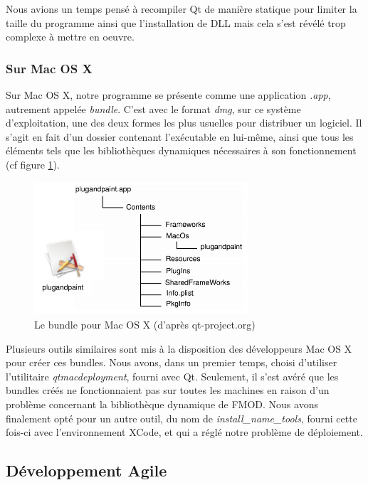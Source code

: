 Nous avions un temps pensé à recompiler Qt de manière statique pour limiter la taille du programme ainsi que l'installation de DLL mais cela s'est révélé trop complexe à mettre en oeuvre.

\subsubsection{Sur Mac OS X}

Sur Mac OS X, notre programme se présente comme une application \textit{.app}, autrement appelée \textit{bundle}. C'est avec le format \textit{dmg}, sur ce système d'exploitation, une des deux formes les plus usuelles pour distribuer un logiciel. Il s'agit en fait d'un dossier contenant l'exécutable en lui-même, ainsi que tous les éléments tels que les bibliothèques dynamiques nécessaires à son fonctionnement (cf figure \ref{app_mac_os}).

\begin{figure}[H]
\begin{center}
\includegraphics[width=300px]{bundle_mac.png}
\caption{Le bundle pour Mac OS X (d'après qt-project.org)}
\label{app_mac_os}
\end{center}
\end{figure}

Plusieurs outils similaires sont mis à la disposition des développeurs Mac OS X pour créer ces bundles. Nous avons, dans un premier temps, choisi d'utiliser l'utilitaire \textit{qtmacdeployment}, fourni avec Qt. Seulement, il s'est avéré que les bundles créés ne fonctionnaient pas sur toutes les machines en raison d'un problème concernant la bibliothèque dynamique de FMOD. Nous avons finalement opté pour un autre outil, du nom de \textit{install\_name\_tools}, fourni cette fois-ci avec l'environnement XCode, et qui a réglé notre problème de déploiement.

\subsection{Développement Agile}

